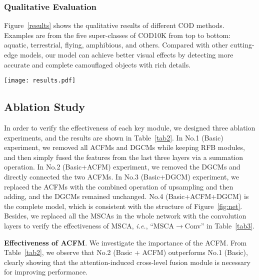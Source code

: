 \documentclass{article}
\def\ie{\emph{i.e.}}
\begin{document}
\subsubsection{Qualitative Evaluation}

Figure~\ref{results} shows the qualitative results of different COD methods. Examples are from the five super-classes of COD10K from top to bottom: aquatic, terrestrial, flying, amphibious, and others. Compared with other cutting-edge models, our model can achieve better visual effects by detecting more accurate and complete camouflaged objects with rich details.

\begin{figure*}[ht]
    \begin{centering}
	\texttt{[image: results.pdf]}
	\caption{Qualitative results of our model and five state-of-the-art methods (\ie, %
	SINet~\protect\cite{fan2021concealed}, EGNet~\protect\cite{egnet}, CPD~\protect\cite{cpd}, BASNet~\protect\cite{basnet}, and MSRCNN~\protect\cite{masksrcnn}).
	}
    \label{results}
    \end{centering}%
\end{figure*}

\subsection{Ablation Study}
In order to verify the effectiveness of each key module, we designed three ablation experiments, and the results are shown in Table~\ref{tab2}. In No.1 (Basic) experiment, we removed all ACFMs and DGCMs while keeping RFB modules, and then simply fused the features from the last three layers via a summation operation. In No.2 (Basic+ACFM) experiment, we removed the DGCMs and directly connected the two ACFMs. In No.3 (Basic+DGCM) experiment, we replaced the ACFMs with the combined operation of upsampling and then adding, and the DGCMs remained unchanged. No.4 (Basic+ACFM+DGCM) is the complete model, which is consistent with the structure of Figure~\ref{fig:net}. Besides, we replaced all the MSCAs in the whole network with the convolution layers to verify the effectiveness of MSCA, \emph{i.e.}, ``MSCA$\rightarrow$Conv'' in Table~\ref{tab3}.

\textbf{Effectiveness of ACFM}. We investigate the importance of the ACFM. From Table~\ref{tab2}, we observe that No.2 (Basic + ACFM) outperforms No.1 (Basic), clearly showing that the attention-induced cross-level fusion module is necessary for improving performance.
\end{document}
